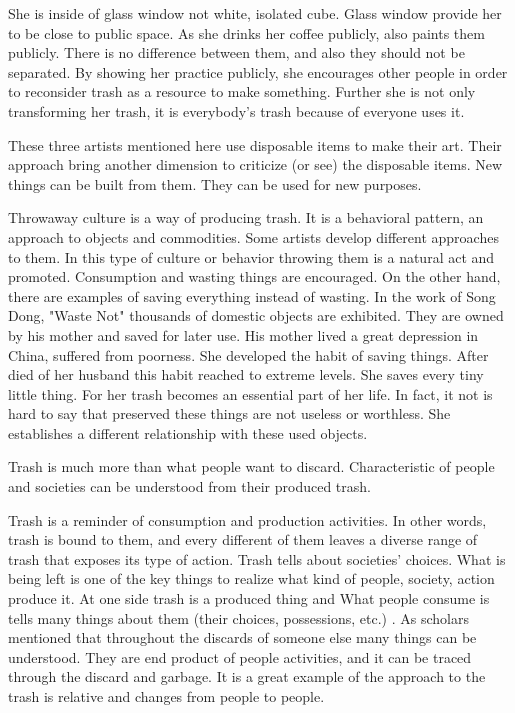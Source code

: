 She is inside of glass window not white, isolated cube. Glass window provide her to be close to public space. As she drinks her coffee publicly, also paints them publicly. 
There is no difference between them, and also they should not be separated. By showing her practice publicly, she encourages other people in order to reconsider trash as a resource to make something. Further she is not only transforming her trash, it is everybody's trash because of everyone uses it.

These three artists mentioned here use disposable items to make their art. Their approach bring another dimension to criticize (or see) the disposable items. New things can be built from them. They can be used for new purposes.

Throwaway culture is a way of producing trash. It is a behavioral pattern, an approach to objects and commodities. Some artists develop different approaches to them. In this type of culture or behavior throwing them is a natural act and promoted. Consumption and wasting things are encouraged. On the other hand, there are examples of saving everything instead of wasting. In the work of Song Dong, "Waste Not" thousands of domestic objects are exhibited. They are owned by his mother and saved for later use. His mother lived a great depression in China, suffered from poorness. She developed the habit of saving things. After died of her husband this habit reached to extreme levels. She saves every tiny little thing. For her trash becomes an essential part of her life. In fact, it not is hard to say that preserved these things are not useless or worthless. She establishes a different relationship with these used objects.






%
%
Trash is much more than what people want to discard. Characteristic of people and societies can be understood from their produced trash.


Trash is a reminder of consumption and production activities. In other words, trash is bound to them, and every different of them leaves a diverse range of trash that exposes its type of action. Trash tells about societies' choices. What is being left is one of the key things to realize what kind of people, society, action produce it. At one side trash is a produced thing and  What people consume is tells many things about them (their choices, possessions, etc.) 
. As scholars mentioned that throughout the discards of someone else many things can be understood. They are end product of people activities, and it can be traced through the discard and garbage. It is a great example of the approach to the trash is relative and changes from people to people.

